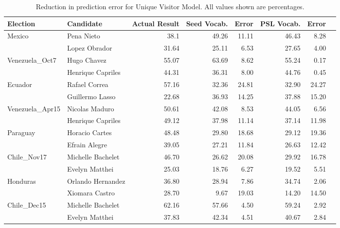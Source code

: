 	\begin{table}
		\centering
		\begin{tabular}{| l | l | r | r | r | r | r | r |}
		\hline
		Election & Candidate & Actual Result & Seed Vocab. & Error & PSL Vocab. & Error \\
		\hline
		\multirow{2}{*}{Mexico} & Pena Nieto & 38.1 & 49.26 & 11.11 & 46.43 & 8.28 \\\cline{2-7}
											   & Lopez Obrador & 31.64 & 25.11 & 6.53 & 27.65 & 4.00 \\
		\hline
		\multirow{2}{*}{Venezuela\_Oct7} & Hugo Chavez & 55.07 & 63.69 & 8.62 & 55.24 & 0.17\\\cline{2-7}
																& Henrique Capriles & 44.31 & 36.31 & 8.00 & 44.76 & 0.45 \\
		\hline
		\multirow{2}{*}{Ecuador} & Rafael Correa & 57.16 & 32.36 & 24.81 & 32.90 & 24.27 \\\cline{2-7}
												 & Guillermo Lasso & 22.68 & 36.93 & 14.25 & 37.88 & 15.20 \\
		\hline
		 \multirow{2}{*}{Venezuela\_Apr15} & Nicolas Maduro & 50.61 & 42.08 & 8.53 & 44.05 & 6.56 \\\cline{2-7}
																	& Henrique Capriles & 49.12 & 37.98 & 11.14 & 37.14 & 11.98 \\
		\hline
		\multirow{2}{*}{Paraguay} & Horacio Cartes & 48.48 & 29.80 & 18.68 & 29.12 & 19.36 \\\cline{2-7}
												   & Efrain Alegre & 39.05 & 27.21 & 11.84 & 26.63 & 12.42 \\
		\hline
		\multirow{2}{*}{Chile\_Nov17} & Michelle Bachelet & 46.70 & 26.62 & 20.08 & 29.92 & 16.78\\\cline{2-7}
														  & Evelyn Matthei & 25.03 & 18.76 & 6.27 & 19.52 & 5.51 \\
		\hline 
		\multirow{2}{*}{Honduras} & Orlando Hernandez & 36.80 & 28.94 & 7.86 & 34.74 & 2.06 \\\cline{2-7}
												   & Xiomara Castro & 28.70 & 9.67 & 19.03 & 14.20 & 14.50 \\
		\hline
		\multirow{2}{*}{Chile\_Dec15} & Michelle Bachelet & 62.16 & 57.66 & 4.50 & 59.24 & 2.92\\\cline{2-7}
															& Evelyn Matthei & 37.83 & 42.34 & 4.51 & 40.67 & 2.84 \\
		\hline 											 
		\end{tabular}
		\caption{Reduction in prediction error for Unique Visitor Model. All values shown are percentages.}
		\label{table:UniVis}
	\end{table}



